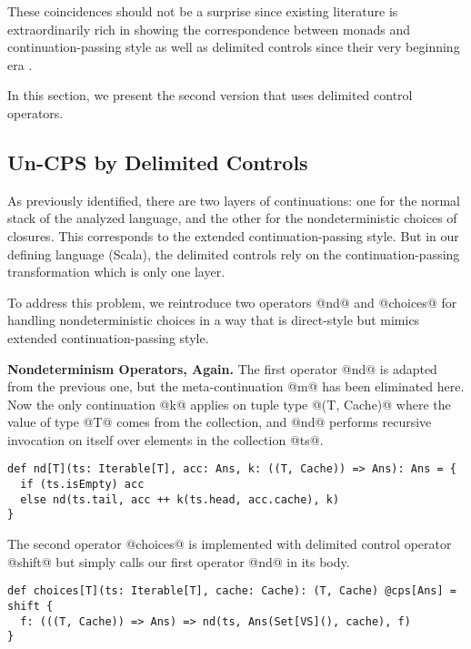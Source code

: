 \documentclass[acmsmall]{acmart}\settopmatter{}
\begin{document}
These coincidences should not be a surprise since existing literature is extraordinarily rich
in showing the correspondence between monads and continuation-passing style as well as
delimited controls since their very beginning era \cite{Danvy:1990:AC:91556.91622, wadler1992essence,
danvy1992representing, moggi1991notions}.

In this section, we present the second version that uses delimited control operators.

\subsection{Un-CPS by Delimited Controls} \label{uncps}

As previously identified, there are two layers of continuations: one for the normal stack 
of the analyzed language, and the other for the nondeterministic choices of closures.
This corresponds to the extended continuation-passing style.
But in our defining language (Scala), the delimited controls rely on the continuation-passing 
transformation which is only one layer.

To address this problem, we reintroduce two operators @nd@ and @choices@ for handling 
nondeterministic choices in a way that is direct-style but mimics extended 
continuation-passing style.

\textbf{Nondeterminism Operators, Again.}
The first operator @nd@ is adapted from the previous one, but the meta-continuation
@m@ has been eliminated here. Now the only continuation @k@ applies on tuple type @(T, Cache)@ 
where the value of type @T@ comes from the collection, and @nd@ performs recursive invocation
on itself over elements in the collection @ts@. 

\begin{lstlisting}
def nd[T](ts: Iterable[T], acc: Ans, k: ((T, Cache)) => Ans): Ans = {
  if (ts.isEmpty) acc
  else nd(ts.tail, acc ++ k(ts.head, acc.cache), k)
}
\end{lstlisting}

The second operator @choices@ is implemented with delimited control operator 
@shift@ but simply calls our first operator @nd@ in its body.

\begin{lstlisting}
def choices[T](ts: Iterable[T], cache: Cache): (T, Cache) @cps[Ans] = shift {
  f: (((T, Cache)) => Ans) => nd(ts, Ans(Set[VS](), cache), f)
}
\end{lstlisting}
\end{document}
